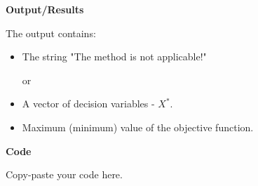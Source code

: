 \documentclass[12pt, legalpaper]{exam}
\begin{document}
\vspace{12pt}
\noindent     \textbf{Output/Results}

The output contains:
\begin{itemize}
    \item The string "The method is not applicable!"
    
or

    \item A vector of decision variables - $X^*$.
    \item Maximum (minimum) value of the objective function.
\end{itemize}

\noindent
{}




\vspace{24pt}
\noindent    
\newpage
\textbf{Code}

Copy-paste your code here.
\end{document}
